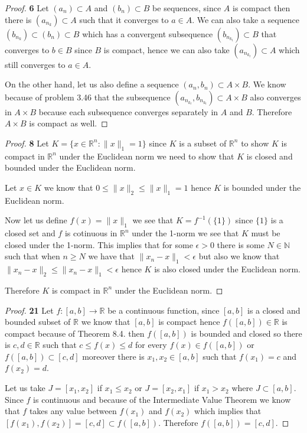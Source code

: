 \documentclass[11pt]{article}
\newcommand{\N}{\mathbb{N}}
\newcommand{\R}{\mathbb{R}}
\theoremstyle{definition}
\begin{document}
    \begin{proof}{\textbf{6}}
        Let $(a_n) \subset A$ and $(b_n) \subset B$ be sequences, since $A$
        is compact then there is $(a_{n_k}) \subset A$ such that it converges
        to $a \in A$. We can also take a sequence
        $(b_{n_k}) \subset (b_n) \subset B$ which has a convergent subsequence
        $(b_{n_{k_t}}) \subset B$ that converges to $b \in B$ since $B$ is
        compact, hence we can also take
        $(a_{n_{k_t}}) \subset A$ which still converges to $a \in A$.        
        
        On the other hand, let us also define a sequence
        $(a_n, b_n) \subset A \times B$. We know because of problem 3.46
        that the subsequence $(a_{n_{k_t}}, b_{n_{k_t}}) \subset A \times B$
        also converges in $A \times B$ because each subsequence converges
        separately in $A$ and $B$. Therefore $A \times B$ is compact as
        well. 
    \end{proof}
\cleardoublepage
    \begin{proof}{\textbf{8}}
        Let $K = \{x \in \R^n: \|x\|_1 = 1\}$ since $K$ is a subset of $\R^n$
        to show $K$ is compact in $\R^n$ under the Euclidean norm we need to
        show that $K$ is closed and bounded under the Euclidean norm.

        Let $x \in K$ we know that $0 \leq \|x\|_2 \leq \|x\|_1 = 1$ hence
        $K$ is bounded under the Euclidean norm.

        Now let us define $f(x) = \|x\|_1$ we see that $K = f^{-1}(\{1\})$
        since $\{1\}$ is a closed set and $f$ is cotinuous in $\R^n$ under the
        1-norm we see that $K$ must be closed under the 1-norm. This implies
        that for some $\epsilon > 0$ there is some $N \in \N$ such that
        when $n \geq N$ we have that $\|x_n - x\|_1 < \epsilon$
        but also we know that $\|x_n - x\|_2 \leq \|x_n - x\|_1 < \epsilon$
        hence $K$ is also closed under the Euclidean norm.

        Therefore $K$ is compact in $\R^n$ under the Euclidean norm.
    \end{proof}
    \begin{proof}{\textbf{21}}
        Let $f:[a,b]\to\R$ be a continuous function, since $[a,b]$ is a
        closed and bounded subset of $\R$ we know that $[a,b]$ is compact hence
        $f([a,b]) \in \R$ is compact because of Theorem 8.4. then $f([a,b])$
        is bounded and closed so there is $c,d \in \R$ such that
        $c \leq f(x) \leq d$ for every $f(x) \in f([a,b])$ or $f([a,b]) \subset [c,d]$
        moreover there is $x_1,x_2 \in[a,b]$ such that $f(x_1) = c$ and
        $f(x_2) = d$.

        Let us take $J = [x_1,x_2]$ if $x_1 \leq x_2$ or $J = [x_2,x_1]$ if
        $x_1 > x_2$ where $J \subset [a,b]$. Since $f$ is continuous and
        because of the Intermediate Value Theorem we know that $f$ takes any
        value between $f(x_1)$ and $f(x_2)$ which implies that
        $[f(x_1), f(x_2)] = [c,d] \subset f([a,b])$.
        Therefore $f([a,b]) = [c,d]$.  

    \end{proof}
\end{document}
